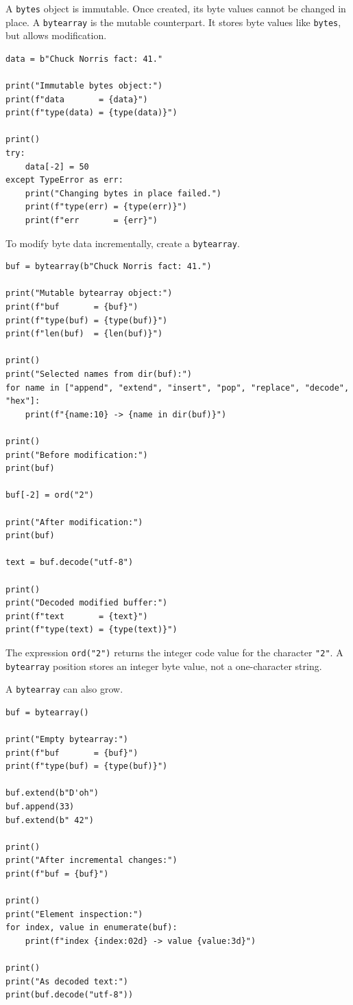 A \texttt{bytes} object is immutable. Once created, its byte values cannot be changed in place. A \texttt{bytearray} is the mutable counterpart. It stores byte values like \texttt{bytes}, but allows modification.

\begin{verbatim}
data = b"Chuck Norris fact: 41."

print("Immutable bytes object:")
print(f"data       = {data}")
print(f"type(data) = {type(data)}")

print()
try:
    data[-2] = 50
except TypeError as err:
    print("Changing bytes in place failed.")
    print(f"type(err) = {type(err)}")
    print(f"err       = {err}")
\end{verbatim}

To modify byte data incrementally, create a \texttt{bytearray}.

\begin{verbatim}
buf = bytearray(b"Chuck Norris fact: 41.")

print("Mutable bytearray object:")
print(f"buf       = {buf}")
print(f"type(buf) = {type(buf)}")
print(f"len(buf)  = {len(buf)}")

print()
print("Selected names from dir(buf):")
for name in ["append", "extend", "insert", "pop", "replace", "decode", "hex"]:
    print(f"{name:10} -> {name in dir(buf)}")

print()
print("Before modification:")
print(buf)

buf[-2] = ord("2")

print("After modification:")
print(buf)

text = buf.decode("utf-8")

print()
print("Decoded modified buffer:")
print(f"text       = {text}")
print(f"type(text) = {type(text)}")
\end{verbatim}

The expression \texttt{ord("2")} returns the integer code value for the character \texttt{"2"}. A \texttt{bytearray} position stores an integer byte value, not a one-character string.

A \texttt{bytearray} can also grow.

\begin{verbatim}
buf = bytearray()

print("Empty bytearray:")
print(f"buf       = {buf}")
print(f"type(buf) = {type(buf)}")

buf.extend(b"D'oh")
buf.append(33)
buf.extend(b" 42")

print()
print("After incremental changes:")
print(f"buf = {buf}")

print()
print("Element inspection:")
for index, value in enumerate(buf):
    print(f"index {index:02d} -> value {value:3d}")

print()
print("As decoded text:")
print(buf.decode("utf-8"))
\end{verbatim}

